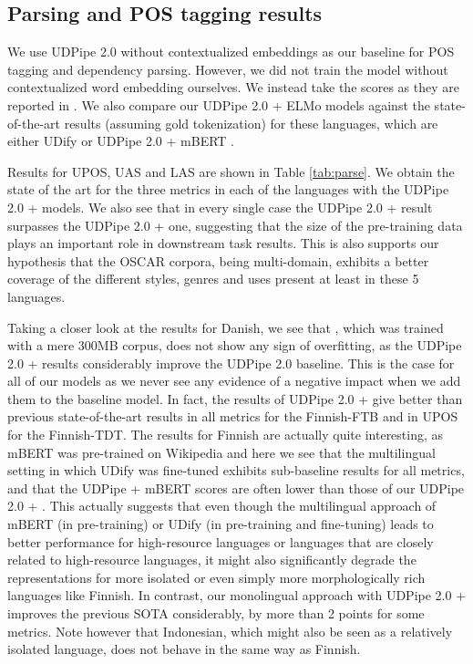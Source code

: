 \subsection{Parsing and POS tagging results}
We use UDPipe 2.0 without contextualized embeddings as our baseline for POS tagging and dependency parsing. However, we did not train the model without contextualized word embedding ourselves. We instead take the scores as they are reported in \citep{kondratyuk-straka-2019-75}. We also compare our UDPipe 2.0 + ELMo models against the state-of-the-art results (assuming gold tokenization) for these languages, which are either UDify \citep{kondratyuk-straka-2019-75} or UDPipe 2.0 + mBERT \citep{straka-strakova-2019-evaluating}.

Results for UPOS, UAS and LAS are shown in Table \ref{tab:parse}. We obtain the state of the art for the three metrics in each of the languages with the UDPipe 2.0 + \elmooscar models. We also see that in every single case the UDPipe 2.0 + \elmooscar result surpasses the UDPipe 2.0 + \elmowiki one, suggesting that the size of the pre-training data plays an important role in downstream task results. This is also supports our hypothesis that the OSCAR corpora, being multi-domain, exhibits a better coverage of the different styles, genres and uses present at least in these 5 languages.

Taking a closer look at the results for Danish, we see that \elmowiki, which was trained with a mere 300MB corpus, does not show any sign of overfitting, as the UDPipe 2.0 + \elmowiki results considerably improve the UDPipe 2.0 baseline. This is the case for all of our \elmowiki models as we never see any evidence of a negative impact when we add them to the baseline model. In fact, the results of UDPipe 2.0 + \elmowiki give better than previous state-of-the-art results in all metrics for the Finnish-FTB and in UPOS for the Finnish-TDT. The results for Finnish are actually quite interesting, as mBERT was pre-trained on Wikipedia and here we see that the multilingual setting in which UDify was fine-tuned exhibits sub-baseline results for all metrics, and that the UDPipe + mBERT scores are often lower than those of our UDPipe 2.0 + \elmowiki. This actually suggests that even though the multilingual approach of mBERT (in pre-training) or UDify (in pre-training and fine-tuning) leads to better performance for  high-resource languages or languages that are closely related to high-resource languages, it might also significantly degrade the representations for more isolated or even simply more morphologically rich languages like Finnish. In contrast, our monolingual approach with UDPipe 2.0 + \elmooscar improves the previous SOTA considerably, by more than 2 points for some metrics. Note however that Indonesian, which might also be seen as a relatively isolated language, does not behave in the same way as Finnish.

